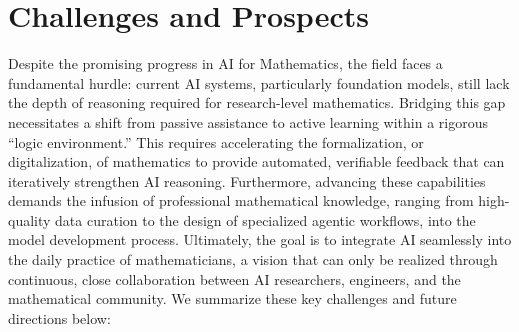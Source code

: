 \documentclass[11pt]{article}
\numberwithin{equation}{section}
\begin{document}





\section{Challenges and Prospects}\label{sec:cp}

Despite the promising progress in AI for Mathematics, the field faces a fundamental hurdle: current AI systems, particularly foundation models, still lack the depth of reasoning required for research-level mathematics. Bridging this gap necessitates a shift from passive assistance to active learning within a rigorous ``logic environment.'' This requires accelerating the formalization, or digitalization, of mathematics to provide automated, verifiable feedback that can iteratively strengthen AI reasoning. Furthermore, advancing these capabilities demands the infusion of professional mathematical knowledge, ranging from high-quality data curation to the design of specialized agentic workflows, into the model development process. Ultimately, the goal is to integrate AI seamlessly into the daily practice of mathematicians, a vision that can only be realized through continuous, close collaboration between AI researchers, engineers, and the mathematical community. We summarize these key challenges and future directions below:
\end{document}
